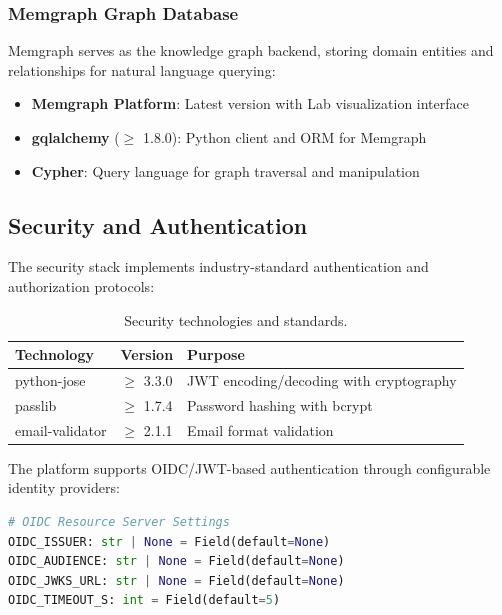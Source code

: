 \subsubsection{Memgraph Graph Database}

Memgraph serves as the knowledge graph backend, storing domain entities and relationships for natural language querying:

\begin{itemize}
    \item \textbf{Memgraph Platform}: Latest version with Lab visualization interface
    \item \textbf{gqlalchemy} ($\geq$ 1.8.0): Python client and ORM for Memgraph
    \item \textbf{Cypher}: Query language for graph traversal and manipulation
\end{itemize}

\subsection{Security and Authentication}

The security stack implements industry-standard authentication and authorization protocols:

\begin{table}[ht]
\centering
\caption{Security technologies and standards.}
\label{tab:security-stack}
\small
\begin{tabular}{lll}
\hline
\textbf{Technology} & \textbf{Version} & \textbf{Purpose} \\
\hline
python-jose & $\geq$ 3.3.0 & JWT encoding/decoding with cryptography \\
passlib & $\geq$ 1.7.4 & Password hashing with bcrypt \\
email-validator & $\geq$ 2.1.1 & Email format validation \\
\hline
\end{tabular}
\end{table}

The platform supports OIDC/JWT-based authentication through configurable identity providers:

\begin{lstlisting}[language=Python, caption={OIDC configuration settings.}]
# OIDC Resource Server Settings
OIDC_ISSUER: str | None = Field(default=None)
OIDC_AUDIENCE: str | None = Field(default=None)
OIDC_JWKS_URL: str | None = Field(default=None)
OIDC_TIMEOUT_S: int = Field(default=5)
\end{lstlisting}

